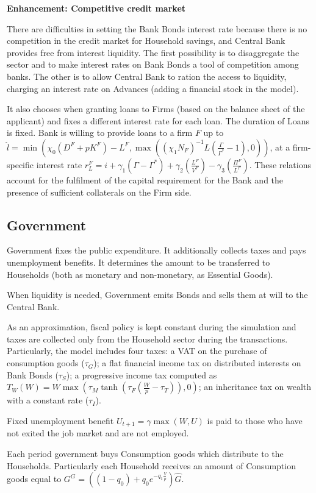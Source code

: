 \documentclass[a4paper, headings=standardclasses]{scrartcl}
\newenvironment{enh}[1][]{\begin{framed}\noindent\textbf{Enhancement: #1}\par}{\end{framed}}
\begin{document}
\begin{enh}[Competitive credit market]
	There are difficulties in setting the Bank Bonds interest rate because there is no competition in the credit market for Household savings, and Central Bank provides free from interest liquidity.
	The first possibility is to disaggregate the sector and to make interest rates on Bank Bonds a tool of competition among banks.
	The other is to allow Central Bank to ration the access to liquidity, charging an interest rate on Advances (adding a financial stock in the model).
\end{enh}

It also chooses when granting loans to Firms (based on the balance sheet of the applicant) and fixes a different interest rate for each loan. The duration of Loans is fixed.
Bank is willing to provide loans to a firm $F$ up to $\hat{l} = \min (\chi_0 (D^F+pK^F) - L^F, \max((\chi_1 N_F)^{-1} L (\frac{\Gamma}{\Gamma^*}-1),0))$, at a firm-specific interest rate $r_L^F = i + \gamma_1 (\Gamma - \Gamma^*) + \gamma_2 (\frac{L^F}{V^F}) - \gamma_3 (\frac{\Pi^F}{L^F})$.
These relations account for the fulfilment of the capital requirement for the Bank and the presence of sufficient collaterals on the Firm side.

\subsection{Government}
Government fixes the public expenditure. It additionally collects taxes and pays unemployment benefits. It determines the amount to be transferred to Households (both as monetary and non-monetary, as Essential Goods).

When liquidity is needed, Government emits Bonds and sells them at will to the Central Bank.

As an approximation, fiscal policy is kept constant during the simulation and taxes are collected only from the Household sector during the transactions. Particularly, the model includes four taxes: a VAT on the purchase of consumption goods ($\tau_G$); a flat financial income tax on distributed interests on Bank Bonds ($\tau_S$); a progressive income tax computed as $T_W(W) = W \max(\tau_M \tanh(\tau_F (\frac{W}{p} - \tau_T)),0)$; an inheritance tax on wealth with a constant rate ($\tau_I$).

Fixed unemployment benefit $U_{t+1} = \gamma \max(W, U)$ is paid to those who have not exited the job market and are not employed.

Each period government buys Consumption goods which distribute to the Households. Particularly each Household receives an amount of Consumption goods equal to $G^G = ((1 - q_0) + q_0 e^{-q_1\frac{V}{p}})\hat{G}$.
\end{document}
